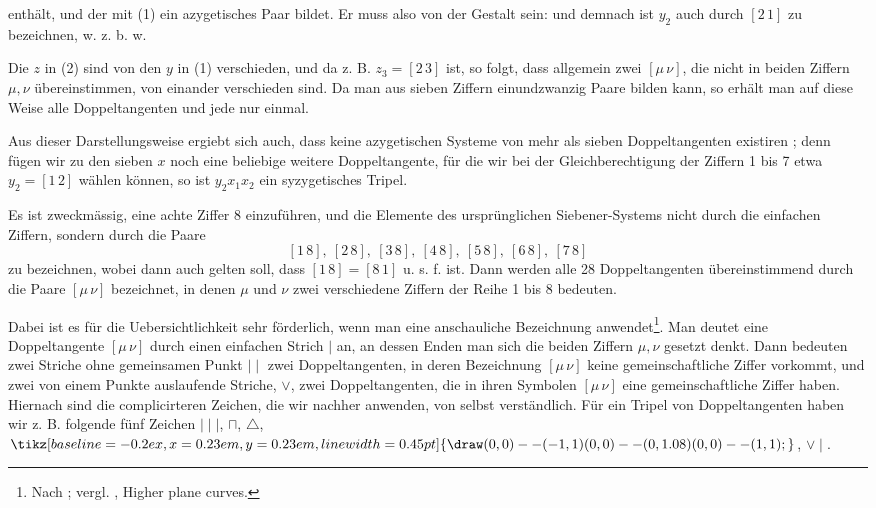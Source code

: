 \providecommand{\weberthreeup}{\mathord{\tikz[baseline=-0.2ex,x=0.23em,y=0.23em,line width=0.45pt]{\draw (0,0)--(-1,1) (0,0)--(0,1.08) (0,0)--(1,1);}}}
enthält, und der mit (1) ein azygetisches Paar bildet. Er muss
also von der Gestalt sein:
und demnach ist $y_2$ auch durch $[2\,1]$ zu bezeichnen, w. z. b. w.

Die $z$ in (2) sind von den $y$ in (1) verschieden, und da z. B.
$z_3 = [2\,3]$ ist, so folgt, dass allgemein zwei $[\mu\,\nu]$, die nicht in
beiden Ziffern $\mu, \nu$ übereinstimmen, von einander verschieden
sind. Da man aus sieben Ziffern einundzwanzig Paare bilden
kann, so erhält man auf diese Weise alle Doppeltangenten und
jede nur einmal.

Aus dieser Darstellungsweise ergiebt sich auch, dass keine
azygetischen Systeme von mehr als sieben Doppeltangenten existiren
; denn fügen wir zu den sieben $x$ noch eine beliebige
weitere Doppeltangente, für die wir bei der Gleichberechtigung
der Ziffern 1 bis 7 etwa $y_2 = [1\,2]$ wählen können, so ist $y_2 x_1 x_2$
ein syzygetisches Tripel.

Es ist zweckmässig, eine achte Ziffer 8 einzuführen, und die
Elemente des ursprünglichen Siebener-Systems nicht durch die
einfachen Ziffern, sondern durch die Paare
\[
[1\,8],\ [2\,8],\ [3\,8],\ [4\,8],\ [5\,8],\ [6\,8],\ [7\,8]
\]
zu bezeichnen, wobei dann auch gelten soll, dass $[1\,8] = [8\,1]$ u. s. f.
ist. Dann werden alle 28 Doppeltangenten übereinstimmend
durch die Paare $[\mu\,\nu]$ bezeichnet, in denen $\mu$ und $\nu$ zwei verschiedene
 Ziffern der Reihe 1 bis 8 bedeuten.

Dabei ist es für die Uebersichtlichkeit sehr förderlich, wenn
man eine anschauliche Bezeichnung anwendet\footnote{Nach ; vergl. , \glqq Higher plane curves\grqq{}.}. Man deutet
eine Doppeltangente $[\mu\,\nu]$ durch einen einfachen Strich $\mid$ an, an
dessen Enden man sich die beiden Ziffern $\mu, \nu$ gesetzt denkt.
Dann bedeuten zwei Striche ohne gemeinsamen Punkt $\mid\mid$ zwei
Doppeltangenten, in deren Bezeichnung $[\mu\,\nu]$ keine gemeinschaftliche
 Ziffer vorkommt, und zwei von einem Punkte auslaufende
Striche, $\vee$, zwei Doppeltangenten, die in ihren Symbolen $[\mu\,\nu]$
eine gemeinschaftliche Ziffer haben. Hiernach sind die complicirteren
 Zeichen, die wir nachher anwenden, von selbst verständlich.
Für ein Tripel von Doppeltangenten haben wir z. B. folgende
fünf Zeichen $\mid\mid\mid$, $\sqcap$, $\triangle$, $\weberthreeup$, $\vee\mid$.
